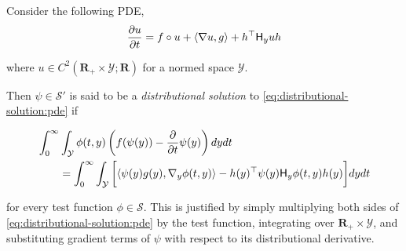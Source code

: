 \begin{definition}\label{def:distributional-solution}
  Consider the following PDE,
  \begin{equation}\label{eq:distributional-solution:pde}
    \partialderiv{u}{t} = f\circ u + \langle\nabla u, g\rangle +
    \quadraticform{h}{\hessian{y}u}
  \end{equation}

  where $u\in C^2(\mathbf{R}_+\times\mathcal{Y};\mathbf{R})$ for a normed space
  $\mathcal{Y}$.

  Then $\psi\in\mathcal{S}'$ is said to be a \emph{distributional solution} to
  \eqref{eq:distributional-solution:pde} if

  \begin{align*}
    &\int_0^\infty\int_{\mathcal{Y}}\phi(t, y)\left(f(\psi(y)) -
      \partialderiv{}{t}\psi(y)\right)dydt\\
    &\qquad=\int_{0}^\infty\int_{\mathcal{Y}}\bigg[\langle \psi(y)g(y), \nabla_y\phi(t,
    y)\rangle - \quadraticform{h(y)}{\psi(y)\hessian{y}\phi(t,
    y)}\bigg]dydt
  \end{align*}

  for every test function $\phi\in\mathcal{S}$. This is justified by simply multiplying both sides of
  \eqref{eq:distributional-solution:pde} by the test function, integrating over
  $\mathbf{R}_+\times\mathcal{Y}$, and substituting gradient terms of $\psi$
  with respect to its distributional derivative.
\end{definition}
